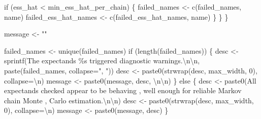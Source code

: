 \documentclass[
  letterpaper,
  DIV=11,
  numbers=noendperiod]{scrartcl}
\newenvironment{Shaded}{\begin{snugshade}}{\end{snugshade}}
\newcommand{\CharTok}[1]{\textcolor[rgb]{0.13,0.47,0.30}{#1}}
\newcommand{\ControlFlowTok}[1]{\textcolor[rgb]{0.00,0.23,0.31}{#1}}
\newcommand{\DecValTok}[1]{\textcolor[rgb]{0.68,0.00,0.00}{#1}}
\newcommand{\NormalTok}[1]{\textcolor[rgb]{0.00,0.23,0.31}{#1}}
\newcommand{\OperatorTok}[1]{\textcolor[rgb]{0.37,0.37,0.37}{#1}}
\newcommand{\SpecialCharTok}[1]{\textcolor[rgb]{0.37,0.37,0.37}{#1}}
\newcommand{\StringTok}[1]{\textcolor[rgb]{0.13,0.47,0.30}{#1}}
\begin{document}
\begin{Shaded}
\begin{Highlighting}[]
      \ControlFlowTok{if}\NormalTok{ (ess\_hat }\OperatorTok{\textless{}}\NormalTok{ min\_ess\_hat\_per\_chain) \{}
\NormalTok{        failed\_names }\OperatorTok{\textless{}{-}}\NormalTok{ c(failed\_names, name)}
\NormalTok{        failed\_ess\_hat\_names }\OperatorTok{\textless{}{-}}\NormalTok{ c(failed\_ess\_hat\_names, name)}
\NormalTok{      \}}
\NormalTok{    \}}
\NormalTok{  \}}
  
\NormalTok{  message }\OperatorTok{\textless{}{-}} \StringTok{""}
  
\NormalTok{  failed\_names }\OperatorTok{\textless{}{-}}\NormalTok{ unique(failed\_names)}
  \ControlFlowTok{if}\NormalTok{ (length(failed\_names)) \{}
\NormalTok{    desc }\OperatorTok{\textless{}{-}} 
\NormalTok{      sprintf(}\StringTok{\textquotesingle{}The expectands }\SpecialCharTok{\%s}\StringTok{ triggered diagnostic warnings.}\CharTok{\textbackslash{}n\textbackslash{}n}\StringTok{\textquotesingle{}}\NormalTok{,}
\NormalTok{              paste(failed\_names, collapse}\OperatorTok{=}\StringTok{", "}\NormalTok{))}
\NormalTok{    desc }\OperatorTok{\textless{}{-}}\NormalTok{ paste0(strwrap(desc, max\_width, }\DecValTok{0}\NormalTok{), collapse}\OperatorTok{=}\StringTok{\textquotesingle{}}\CharTok{\textbackslash{}n}\StringTok{\textquotesingle{}}\NormalTok{)}
\NormalTok{    message }\OperatorTok{\textless{}{-}}\NormalTok{ paste0(message, desc, }\StringTok{\textquotesingle{}}\CharTok{\textbackslash{}n\textbackslash{}n}\StringTok{\textquotesingle{}}\NormalTok{)}
\NormalTok{  \} }\ControlFlowTok{else}\NormalTok{ \{}
\NormalTok{    desc }\OperatorTok{\textless{}{-}}\NormalTok{ paste0(}\StringTok{\textquotesingle{}All expectands checked appear to be behaving \textquotesingle{}}\NormalTok{,}
                   \StringTok{\textquotesingle{}well enough for reliable Markov chain Monte \textquotesingle{}}\NormalTok{,}
                   \StringTok{\textquotesingle{}Carlo estimation.}\CharTok{\textbackslash{}n\textbackslash{}n}\StringTok{\textquotesingle{}}\NormalTok{)}
\NormalTok{    desc }\OperatorTok{\textless{}{-}}\NormalTok{ paste0(strwrap(desc, max\_width, }\DecValTok{0}\NormalTok{), collapse}\OperatorTok{=}\StringTok{\textquotesingle{}}\CharTok{\textbackslash{}n}\StringTok{\textquotesingle{}}\NormalTok{)}
\NormalTok{    message }\OperatorTok{\textless{}{-}}\NormalTok{ paste0(message, desc)}
\NormalTok{  \}}


\end{Highlighting}
\end{Shaded}
\end{document}
